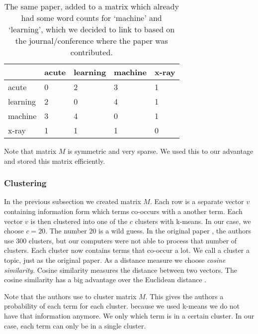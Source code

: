 \begin{table}
	\begin{center}

\begin{tabular}{|l|l|l|l|l|}
\hline
	 	& acute  & learning & machine &  x-ray \\ \hline
acute 	&	0 	& 	2 &	 3 &  1	 \\ \hline
learning&	2	&	0 &	 4 &  1	 \\ \hline
machine &	3	&	4 &	 0 &  1	 \\ \hline
x-ray	&	1	&	1 &	 1 &  0	 \\ \hline
\end{tabular} 

	\end{center}
\caption{The same paper, added to a matrix which already had some word counts for `machine' and `learning', which we decided to link to based on the journal/conference where the paper was contributed.}
	\label{tab:after}
\end{table}

Note that matrix $M$ is symmetric and very sparse. We used this to our advantage and stored this matrix efficiently.


\subsubsection*{Clustering}

In the previous subsection we created matrix $M$. Each row is a separate vector $v$ containing information form which terms co-occurs with a another term. Each vector $v$ is then clustered into one of the $c$ clusters with k-means. In our case, we choose  $c = 20$. The number 20 is a wild guess. In the original paper \cite{steyvers2004probabilistic}, the authors use 300 clusters, but our computers were not able to process that number of clusters. Each cluster now contains terms that co-occur a lot. We call a cluster a topic, just as the original paper. As a distance measure we choose \emph{cosine similarity}. Cosine similarity measures the distance between two vectors. The cosine similarity has a big advantage over the Euclidean distance \cite{chowdhury2010introduction}.  

Note that the authors use  to cluster matrix $M$. This gives the authors a probability of each term for each cluster. because we used k-means we do not have that information anymore. We only which term is in a certain cluster. In our case, each term can only be in a single cluster.

